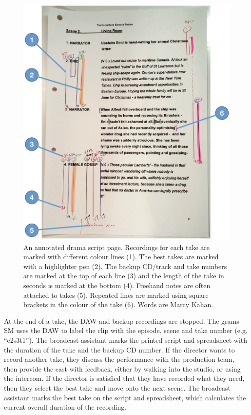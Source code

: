 \begin{figure}
  \centering
  \includegraphics[width=\columnwidth]{figs/drama-markup-labelled.pdf}
  \caption[An annotated drama script page.]{An annotated drama script page. Recordings for each take are marked with
    different colour lines (1). The best takes are marked with a highlighter pen (2). The backup CD/track and take
    numbers are marked at the top of each line (3) and the length of the take in seconds is marked at the bottom (4).
    Freehand notes are often attached to takes (5). Repeated lines are marked using square brackets in the colour of
  the take (6). Words are  Marcy Kahan.}
  \label{fig:drama-script}
\end{figure}

At the end of a take, the DAW and backup recordings are stopped. The grams SM uses the DAW to label the clip with the
episode, scene and take number (e.g. ``e2s3t1''). The broadcast assistant marks the printed script and spreadsheet with
the duration of the take and the backup CD number.  If the director wants to record another take, they discuss the
performance with the production team, then provide the cast with feedback, either by walking into the studio, or using
the intercom.  If the director is satisfied that they have recorded what they need, then they select the best take and
move onto the next scene. The broadcast assistant marks the best take on the script and spreadsheet, which calculates
the current overall duration of the recording.

